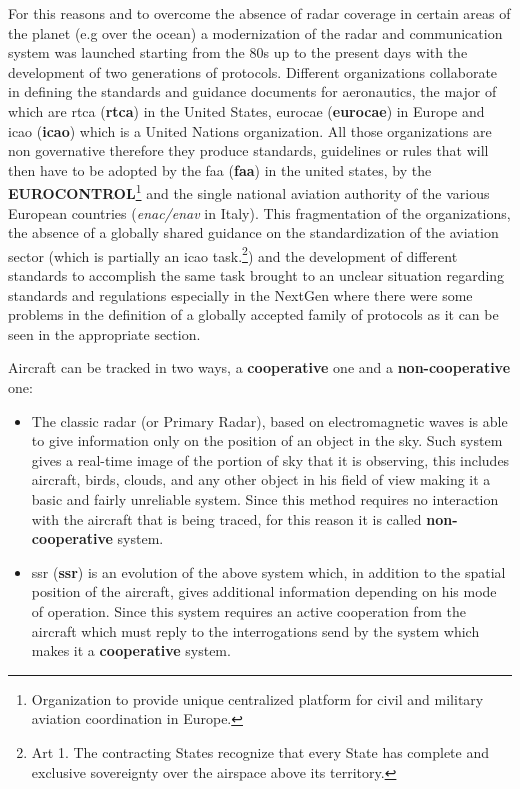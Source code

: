 \documentclass[../main.tex]{subfiles}
\begin{document}
For this reasons and to overcome the absence of radar coverage in certain areas of the planet (e.g over the ocean) a modernization of the radar and communication system was launched starting from the 80s up to the present days with the development of two generations of protocols. Different organizations collaborate in defining the standards and guidance documents for aeronautics, the major of which are \acrlong{rtca} (\textbf{\acrshort{rtca}}) in the United States, \acrlong{eurocae} (\textbf{\acrshort{eurocae}}) in Europe and \acrlong{icao} (\textbf{\acrshort{icao}}) which is a United Nations organization. All those organizations are non governative therefore they produce standards, guidelines or rules that will then have to be adopted by the \acrlong{faa} (\textbf{\acrshort{faa}}) in the united states, by the \textbf{EUROCONTROL}\footnote{Organization to provide unique centralized platform for civil and military aviation coordination in Europe.} and the single national aviation authority of the various European countries (\textit{\acrshort{enac}/\acrshort{enav}} in Italy). This fragmentation of the organizations, the absence of a globally shared guidance on the standardization of the aviation sector (which is partially an \acrshort{icao} task.\footnote{Art 1. The contracting States recognize that every  State has complete and exclusive sovereignty over the airspace above its territory.\cite{icao7300}}) and the development of different standards to accomplish the same task brought to an unclear situation regarding standards and regulations especially in the NextGen where there were some problems in the definition of a globally accepted family of protocols as it can be seen in the appropriate section.

Aircraft can be tracked in two ways, a \textbf{cooperative} one and a \textbf{non-cooperative} one:

\begin{itemize}

  \item The classic radar (or Primary Radar), based on electromagnetic waves is able to give information only on the position of an object in the sky. Such system gives a real-time image of the portion of sky that it is observing, this includes aircraft, birds, clouds, and any other object in his field of view making it a basic and fairly unreliable system. Since this method requires no interaction with the aircraft that is being traced, for this reason it is called \textbf{non-cooperative} system.
  \item \acrlong{ssr} (\textbf{\acrshort{ssr}}) is an evolution of the above system which, in addition to the spatial position of the aircraft, gives additional information depending on his mode of operation. Since this system requires an active cooperation from the aircraft which must reply to the interrogations send by the system which makes it a \textbf{cooperative} system.

\end{itemize}
\end{document}
